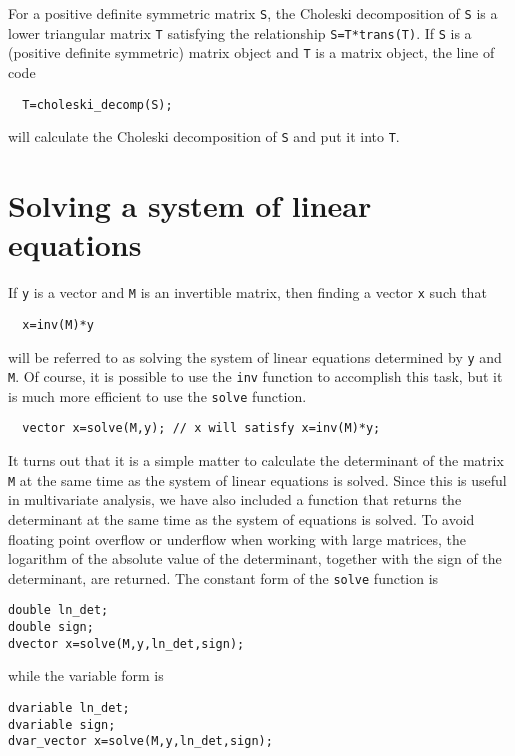 \documentclass{admbmanual}
\begin{document}
For a positive definite symmetric matrix \texttt{S}, the Choleski decomposition
of \texttt{S} is a lower triangular matrix \texttt{T} satisfying the
relationship \texttt{S=T*trans(T)}. If \texttt{S} is a (positive definite
symmetric) matrix object and \texttt{T} is a matrix object, the line of code
\begin{lstlisting}
  T=choleski_decomp(S);
\end{lstlisting}
will calculate the Choleski decomposition of \texttt{S} and put it into
\texttt{T}.

\section{Solving a system of linear equations}

If \texttt{y} is a vector and \texttt{M} is an invertible matrix, then finding a
vector \texttt{x} such that
\begin{lstlisting}
  x=inv(M)*y
\end{lstlisting}
will be referred to as solving the system of linear equations determined by
\texttt{y} and \texttt{M}. Of course, it is possible to use the \texttt{inv}
function to accomplish this task, but it is much more efficient to use the
\texttt{solve} function.
\begin{lstlisting}
  vector x=solve(M,y); // x will satisfy x=inv(M)*y;
\end{lstlisting}

It turns out that it is a simple matter to calculate the determinant of the
matrix \texttt{M} at the same time as the system of linear equations is solved.
Since this is useful in multivariate analysis, we have also included a function
that returns the determinant at the same time as the system of equations is
solved. To avoid floating point overflow or underflow when working with large
matrices, the logarithm of the absolute value of the determinant, together with
the sign of the determinant, are returned. The constant form of the
\texttt{solve} function is
\begin{lstlisting}
double ln_det;
double sign;
dvector x=solve(M,y,ln_det,sign);
\end{lstlisting}
while the variable form is
\begin{lstlisting}
dvariable ln_det;
dvariable sign;
dvar_vector x=solve(M,y,ln_det,sign);
\end{lstlisting}
\end{document}
